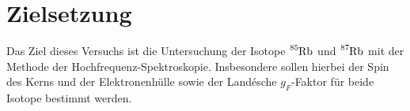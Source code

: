 \section{Zielsetzung}
Das Ziel dieses Versuchs ist die Untersuchung der Isotope $\ce{^{85}Rb}$ und $\ce{^{87}Rb}$ mit der Methode der Hochfrequenz-Spektroskopie. Insbesondere sollen hierbei der Spin des Kerns und der Elektronenhülle sowie der Landésche $g_F$-Faktor für beide Isotope bestimmt werden.
